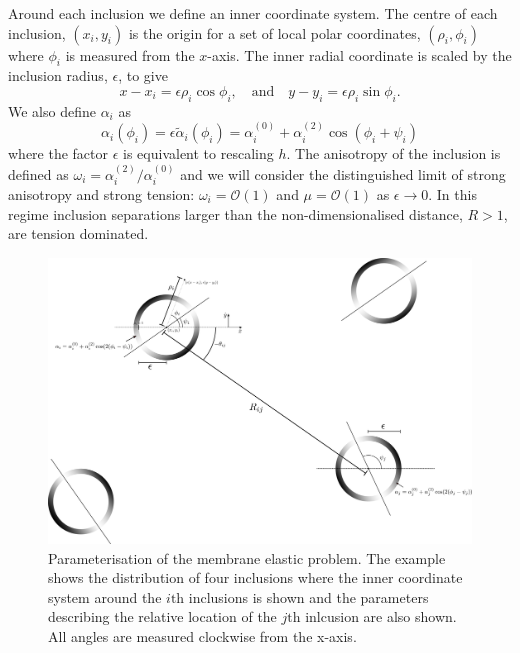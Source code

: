 Around each inclusion we define an inner coordinate system. The centre of each inclusion, $(x_i, y_i)$ is the origin for a set of local polar coordinates, $(\rho_i, \phi_i)$ where $\phi_i$ is measured from the $x$-axis. The inner radial coordinate is scaled by the inclusion radius, $\epsilon$, to give
\begin{equation}
    x-x_i = \epsilon \rho_i \cos\phi_i, \quad \text{and} \quad y-y_i = \epsilon \rho_i \sin\phi_i.
\end{equation}
We also define $\alpha_i$ as
\begin{equation}
    \alpha_i(\phi_i) = \epsilon\tilde\alpha_i(\phi_i) = \alpha_i^{(0)}+\alpha_i^{(2)}\cos(\phi_i + \psi_i)
\end{equation}
where the factor $\epsilon$ is equivalent to rescaling $h$. The anisotropy of the inclusion is defined as $\omega_i=\alpha_i^{(2)}/\alpha_i^{(0)}$ and we will consider the distinguished limit of strong anisotropy and strong tension: $\omega_i=\mathcal{O}(1)$ and $\mu=\mathcal{O}(1)$ as $\epsilon\rightarrow 0$. In this regime inclusion separations larger than the non-dimensionalised distance, $R > 1$, are tension dominated.
\begin{figure}[h]
\centering
\includegraphics[width=12cm]{elastic_figs/boundary_shade.pdf}
\caption{Parameterisation of the membrane elastic problem. The example shows the distribution of four inclusions where the inner coordinate system around the $i\text{th}$ inclusions is shown and the parameters describing the relative location of the $j\text{th}$ inlcusion are also shown. All angles are measured clockwise from the x-axis.}
\label{fig:setup}
\end{figure}


